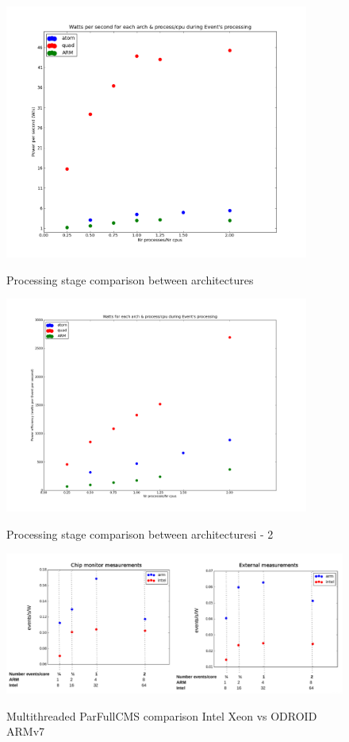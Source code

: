\begin{figure}[h!]
  \centering
    \includegraphics[width=100mm]{"img/aalto/aalto_all"}
    \label{fig:nf_ss}
    \caption{Processing stage comparison between architectures}
\end{figure}



\begin{figure}[h!]
  \centering
    \includegraphics[width=100mm]{"img/aalto/aalto_all2"}
    \label{fig:nf_ss}
    \caption{Processing stage comparison between architecturesi - 2}
\end{figure}


\begin{figure}[h!]
  \centering
    \includegraphics[width=150mm]{"img/acat/results1"}
    \label{fig:nf_ss}
    \caption{Multithreaded ParFullCMS comparison Intel Xeon vs ODROID ARMv7}
\end{figure}


